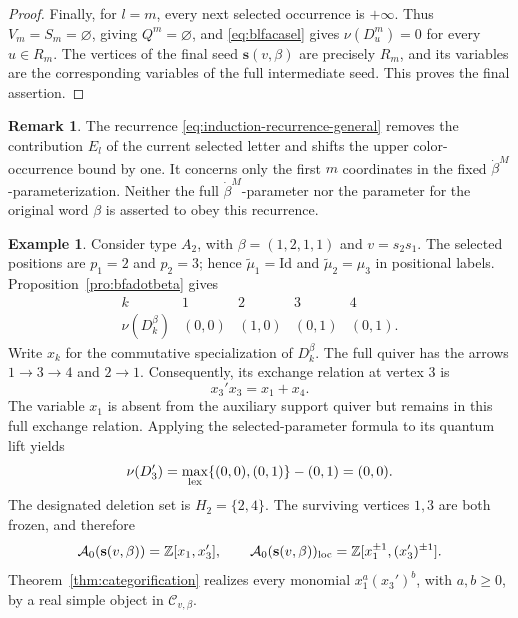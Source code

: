 \documentclass[12pt, reqno]{amsart}
\theoremstyle{plain}
\theoremstyle{definition}
\newtheorem{example}[theorem]{Example}
\newtheorem{remark}[theorem]{Remark}
\numberwithin{equation}{section}
\newcommand{\cA}{\mathcal{A}}
\begin{document}
\begin{proof}
Finally, for \(l=m\), every next selected occurrence is \(+\infty\).
Thus \(V_m=S_m=\varnothing\), giving \(Q^m=\varnothing\), and
\eqref{eq:blfacasel} gives \(\nu(D^m_u)=0\) for every \(u\in R_m\).
The vertices of the final seed \(\mathbf s(v,\beta)\) are precisely
\(R_m\), and its variables are the corresponding variables of the
full intermediate seed. This proves the final assertion.
\end{proof}

\begin{remark}
The recurrence \eqref{eq:induction-recurrence-general} removes the
contribution \(E_l\) of the current selected letter and shifts the
upper color-occurrence bound by one. It concerns only the first
\(m\) coordinates in the fixed \(\dot\beta^M\)-parameterization.
Neither the full \(\dot\beta^M\)-parameter nor the parameter for the
original word \(\beta\) is asserted to obey this recurrence.
\end{remark}

\begin{example}\label{ex:rank-two-truncated-mutation}
Consider type $A_2$, with $\beta=(1,2,1,1)$ and $v=s_2s_1$.
The selected positions are $p_1=2$ and $p_2=3$; hence
$\widetilde\mu_1=\mathrm{Id}$ and $\widetilde\mu_2=\mu_3$ in positional
labels. Proposition~\ref{pro:bfadotbeta} gives
\[
\begin{array}{c|cccc}
 k&1&2&3&4\\\hline
 \nu(D_k^\beta)&(0,0)&(1,0)&(0,1)&(0,1).
\end{array}
\]
Write $x_k$ for the commutative specialization of $D_k^\beta$.
The full quiver has the arrows $1\to3\to4$ and $2\to1$.
Consequently, its exchange relation at vertex $3$ is
\[
 x_3'x_3=x_1+x_4.
\]
The variable $x_1$ is absent from the auxiliary support quiver but
remains in this full exchange relation. Applying the selected-parameter
formula to its quantum lift yields
\[
 \nu(D_3')=\max_{\rm lex}\{(0,0),(0,1)\}-(0,1)=(0,0).
\]
The designated deletion set is $H_2=\{2,4\}$. The surviving vertices
$1,3$ are both frozen, and therefore
\[
 \cA_0(\mathbf s(v,\beta))=\mathbb Z[x_1,x_3'],
 \qquad
 \cA_0(\mathbf s(v,\beta))_{\rm loc}
 =\mathbb Z[x_1^{\pm1},(x_3')^{\pm1}].
\]
Theorem~\ref{thm:categorification} realizes every monomial
$x_1^a(x_3')^b$, with $a,b\geq0$, by a real simple object in
$\mathscr C_{v,\beta}$.
\end{example}
\end{document}
